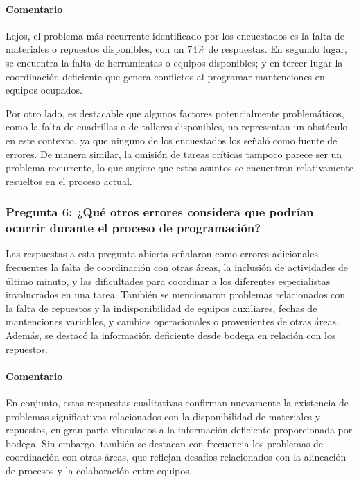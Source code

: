 \documentclass{article}
\begin{document}
\begin{appendix}
    \paragraph{Comentario} Lejos, el problema más recurrente identificado por los encuestados es la falta de materiales o repuestos disponibles, con un 74\% de respuestas. En segundo lugar, se encuentra la falta de herramientas o equipos disponibles; y en tercer lugar la coordinación deficiente que genera conflictos al programar mantenciones en equipos ocupados.
    
    Por otro lado, es destacable que algunos factores potencialmente problemáticos, como la falta de cuadrillas o de talleres disponibles, no representan un obstáculo en este contexto, ya que ninguno de los encuestados los señaló como fuente de errores. De manera similar, la omisión de tareas críticas tampoco parece ser un problema recurrente, lo que sugiere que estos asuntos se encuentran relativamente resueltos en el proceso actual.
    
    \vspace{1.5em}
    \subsubsection*{Pregunta 6: ¿Qué otros errores considera que podrían ocurrir durante el proceso de programación?}
    
    Las respuestas a esta pregunta abierta señalaron como errores adicionales frecuentes la falta de coordinación con otras áreas, la inclusión de actividades de último minuto, y las dificultades para coordinar a los diferentes especialistas involucrados en una tarea. También se mencionaron problemas relacionados con la falta de repuestos y la indisponibilidad de equipos auxiliares, fechas de mantenciones variables, y cambios operacionales o provenientes de otras áreas. Además, se destacó la información deficiente desde bodega en relación con los repuestos.
    
    \paragraph{Comentario} En conjunto, estas respuestas cualitativas confirman nuevamente la existencia de problemas significativos relacionados con la disponibilidad de materiales y repuestos, en gran parte vinculados a la información deficiente proporcionada por bodega. Sin embargo, también se destacan con frecuencia los problemas de coordinación con otras áreas, que reflejan desafíos relacionados con la alineación de procesos y la colaboración entre equipos.
    

\end{appendix}
\end{document}
